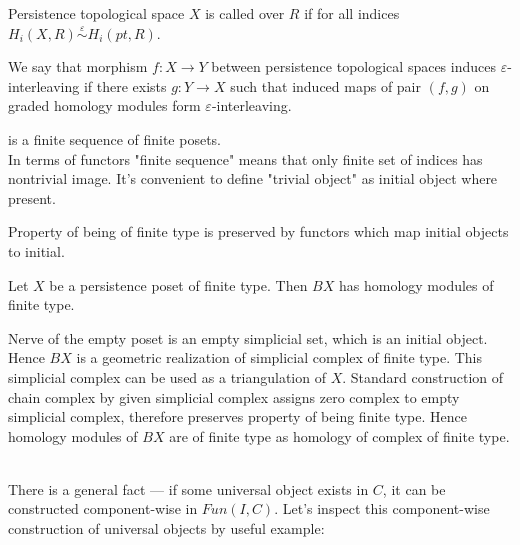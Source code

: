 \begin{definition}
  Persistence topological space $X$ is called  over $R$ if for all indices\\ $H_i(X,R) \stackrel{\varepsilon}{\sim} H_i(pt,R)$.
\end{definition}

\begin{definition}
  We say that morphism $f : X \to Y$ between persistence topological spaces induces $\varepsilon$-interleaving if there exists $g : Y \to X$ such that induced maps of pair $(f,g)$ on graded homology modules form $\varepsilon$-interleaving.
\end{definition}

\begin{definition}
   is a finite sequence of finite posets.\\

  In terms of functors "finite sequence" means that only finite set of indices has nontrivial image. It's convenient to define "trivial object" as initial object where present.
\end{definition}

Property of being of finite type is preserved by functors which map initial objects to initial.\\

\begin{proposition}
  Let $X$ be a persistence poset of finite type. Then $BX$ has homology modules of finite type.
\end{proposition}

\begin{pf}
  Nerve of the empty poset is an empty simplicial set, which is an initial object. Hence $BX$ is a geometric realization of simplicial complex of finite type. This simplicial complex can be used as a triangulation of $X$. Standard construction of chain complex by given simplicial complex assigns zero complex to empty simplicial complex, therefore preserves property of being finite type. Hence homology modules of $BX$ are of finite type as homology of complex of finite type.
\end{pf}\\

There is a general fact --- if some universal object exists in $C$, it can be constructed component-wise in $Fun(I,C)$. Let's inspect this component-wise construction of universal objects by useful example:\\

